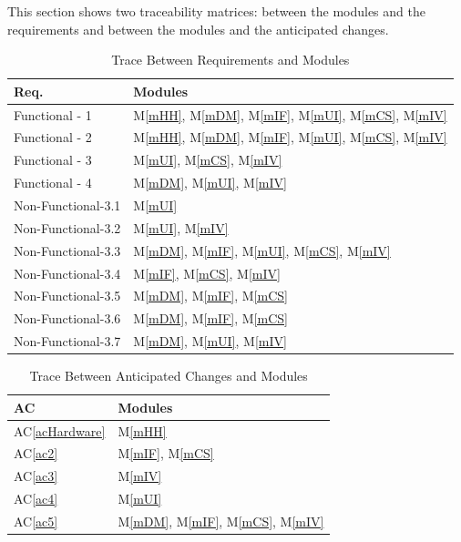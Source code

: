 \documentclass[12pt, titlepage]{article}
\newcommand{\acref}[1]{AC\ref{#1}}
\newcommand{\mref}[1]{M\ref{#1}}
\begin{document}
This section shows two traceability matrices: between the modules and the
requirements and between the modules and the anticipated changes.

\begin{table}[H]
\centering
\begin{tabular}{p{} p{}}
\toprule
\textbf{Req.} & \textbf{Modules}\\
\midrule
Functional - 1 & \mref{mHH}, \mref{mDM}, \mref{mIF}, \mref{mUI}, \mref{mCS}, \mref{mIV} \\
Functional - 2 & \mref{mHH}, \mref{mDM}, \mref{mIF}, \mref{mUI}, \mref{mCS}, \mref{mIV}\\
Functional - 3 & \mref{mUI}, \mref{mCS}, \mref{mIV} \\
Functional - 4 & \mref{mDM}, \mref{mUI}, \mref{mIV}\\
Non-Functional-3.1 & \mref{mUI}\\
Non-Functional-3.2 & \mref{mUI}, \mref{mIV}\\
Non-Functional-3.3 & \mref{mDM}, \mref{mIF}, \mref{mUI}, \mref{mCS}, \mref{mIV}\\
Non-Functional-3.4 & \mref{mIF}, \mref{mCS}, \mref{mIV}\\
Non-Functional-3.5 & \mref{mDM}, \mref{mIF}, \mref{mCS}\\
Non-Functional-3.6 & \mref{mDM}, \mref{mIF}, \mref{mCS}\\
Non-Functional-3.7 & \mref{mDM}, \mref{mUI}, \mref{mIV}\\
\bottomrule
\end{tabular}
\caption{Trace Between Requirements and Modules}
\label{TblRT}
\end{table}

\begin{table}[H]
\centering
\begin{tabular}{p{} p{}}
\toprule
\textbf{AC} & \textbf{Modules}\\
\midrule
\acref{acHardware} & \mref{mHH}\\
\acref{ac2} & \mref{mIF}, \mref{mCS}\\
\acref{ac3} & \mref{mIV}\\
\acref{ac4} & \mref{mUI}\\
\acref{ac5} & \mref{mDM}, \mref{mIF}, \mref{mCS}, \mref{mIV}\\

\bottomrule
\end{tabular}
\caption{Trace Between Anticipated Changes and Modules}
\label{TblACT}
\end{table}
\end{document}
